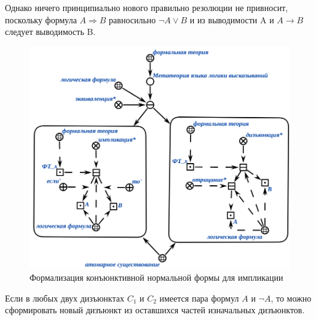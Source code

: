 Однако ничего принципиально нового правильно резолюции не привносит, поскольку формула $A \Rightarrow B$  равносильно $\neg A \lor B$ и из выводимости A и $A \rightarrow B$ следует выводимость B.

\begin{figure}[H]
	\includegraphics[scale=0.6]{author/part3/figures/conjunction_implication_rule.png}
	\caption{Формализация конъюнктивной нормальной формы для импликации}
	\label{fig:conjunction_implication_rule}
\end{figure}

Если в любых двух дизъюнктах $C_1$ и $C_2$ имеется пара формул $A$ и $\neg A$, то можно сформировать новый дизъюнкт из оставшихся частей изначальных дизъюнктов.

